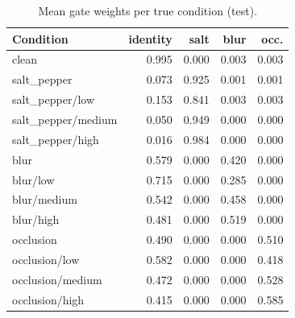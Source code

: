 \begin{table}[t]
\centering
\caption{Mean gate weights per true condition (test).}
\label{tab:t3_weights}
\footnotesize
\begin{tabular}{lrrrr}
\toprule
Condition & identity & salt & blur & occ. \\
\midrule
clean & 0.995 & 0.000 & 0.003 & 0.003 \\
salt\_pepper & 0.073 & 0.925 & 0.001 & 0.001 \\
salt\_pepper/low & 0.153 & 0.841 & 0.003 & 0.003 \\
salt\_pepper/medium & 0.050 & 0.949 & 0.000 & 0.000 \\
salt\_pepper/high & 0.016 & 0.984 & 0.000 & 0.000 \\
blur & 0.579 & 0.000 & 0.420 & 0.000 \\
blur/low & 0.715 & 0.000 & 0.285 & 0.000 \\
blur/medium & 0.542 & 0.000 & 0.458 & 0.000 \\
blur/high & 0.481 & 0.000 & 0.519 & 0.000 \\
occlusion & 0.490 & 0.000 & 0.000 & 0.510 \\
occlusion/low & 0.582 & 0.000 & 0.000 & 0.418 \\
occlusion/medium & 0.472 & 0.000 & 0.000 & 0.528 \\
occlusion/high & 0.415 & 0.000 & 0.000 & 0.585 \\
\bottomrule
\end{tabular}
\end{table}
